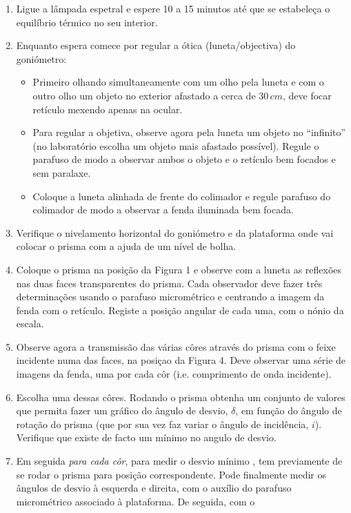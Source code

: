 \documentclass[a4paper,12pt]{article}  %
\begin{document}
\begin{enumerate}
\item Ligue  a  lâmpada  espetral  e  espere  10  a  15  minutos    até  que  se  estabeleça  o 
equilíbrio térmico no seu interior. 
\item Enquanto espera comece por regular a ótica (luneta/objectiva) do goniómetro:
\begin{itemize}
\item  Primeiro olhando simultaneamente com um 
olho pela luneta  e  com o outro olho um objeto no exterior afastado a cerca de $30\,cm$,  deve focar retículo mexendo apenas na ocular.  
\item Para  regular  a  objetiva,  observe  agora pela luneta um  objeto  no  “infinito” (no  laboratório 
escolha  um objeto  mais  afastado possível).  Regule  o  parafuso de  modo  a 
observar ambos o objeto e o retículo bem focados e sem paralaxe. 
\item Coloque  a  luneta  alinhada de frente  do  colimador  e  regule  parafuso  do colimador de modo a observar a fenda iluminada bem focada. 
\end{itemize}
\item Verifique o nivelamento horizontal do goniómetro e da plataforma onde vai colocar o prisma com a ajuda de um nível de bolha. 
\item Coloque o prisma na posição da Figura 1 e observe com a luneta as reflexões nas duas faces transparentes do prisma.  Cada observador deve fazer três determinações usando o parafuso  micrométrico e centrando  a  imagem  da  fenda  com  o retículo. Registe a posição angular de cada uma, com o nónio da escala.
\item  Observe agora  a  transmissão  das várias côres  através  do  prisma  com  o  feixe  incidente  numa  das  faces, na posiçao da Figura 4.  Deve  observar   uma  série  de 
imagens da fenda, uma por cada côr (i.e. comprimento de onda incidente).
\item Escolha uma dessas côres. Rodando o prisma obtenha um conjunto de valores que permita fazer um gráfico do ângulo de desvio, $\delta$, 
em função do ângulo de rotação do prisma (que por sua vez faz variar o ângulo de incidência, $i$). Verifique que existe de facto um mínimo no angulo de desvio.  
\item  Em seguida \emph{para cada côr}, para medir o desvio mínimo , tem previamente de se rodar o prisma para posição correspondente. Pode finalmente medir os ângulos de desvio à esquerda e direita, 
com  o auxílio  do  parafuso  micrométrico  associado  à  plataforma.  De seguida,  com  o 

\end{enumerate}
\end{document}
